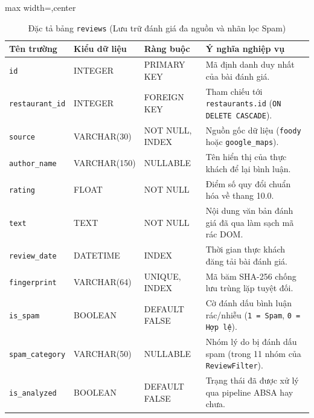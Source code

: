 \documentclass[12pt, a4paper]{article}
\begin{document}
\begin{table}[!htbp]
\centering
\caption{Đặc tả bảng \texttt{reviews} (Lưu trữ đánh giá đa nguồn và nhãn lọc Spam)}
\vspace{0.15cm}
\footnotesize
\begin{adjustbox}{max width=\textwidth,center}
\begin{tabularx}{0.97\textwidth}{l l l X}
\toprule
\rowcolor{blue!8}
\textbf{Tên trường} & \textbf{Kiểu dữ liệu} & \textbf{Ràng buộc} & \textbf{Ý nghĩa nghiệp vụ} \\
\midrule
\texttt{id} & INTEGER & PRIMARY KEY & Mã định danh duy nhất của bài đánh giá. \\
\texttt{restaurant\_id} & INTEGER & FOREIGN KEY & Tham chiếu tới \texttt{restaurants.id} (\texttt{ON DELETE CASCADE}). \\
\texttt{source} & VARCHAR(30) & NOT NULL, INDEX & Nguồn gốc dữ liệu (\texttt{foody} hoặc \texttt{google\_maps}). \\
\texttt{author\_name} & VARCHAR(150) & NULLABLE & Tên hiển thị của thực khách để lại bình luận. \\
\texttt{rating} & FLOAT & NOT NULL & Điểm số quy đổi chuẩn hóa về thang 10.0. \\
\texttt{text} & TEXT & NOT NULL & Nội dung văn bản đánh giá đã qua làm sạch mã rác DOM. \\
\texttt{review\_date} & DATETIME & INDEX & Thời gian thực khách đăng tải bài đánh giá. \\
\texttt{fingerprint} & VARCHAR(64) & UNIQUE, INDEX & Mã băm SHA-256 chống lưu trùng lặp tuyệt đối. \\
\texttt{is\_spam} & BOOLEAN & DEFAULT FALSE & Cờ đánh dấu bình luận rác/nhiễu (\texttt{1 = Spam}, \texttt{0 = Hợp lệ}). \\
\texttt{spam\_category} & VARCHAR(50) & NULLABLE & Nhóm lý do bị đánh dấu spam (trong 11 nhóm của \texttt{ReviewFilter}). \\
\texttt{is\_analyzed} & BOOLEAN & DEFAULT FALSE & Trạng thái đã được xử lý qua pipeline ABSA hay chưa. \\
\bottomrule
\end{tabularx}
\end{adjustbox}
\end{table}
\end{document}
